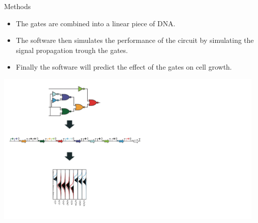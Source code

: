 \documentclass[10pt]{beamer}
\begin{document}
\begin{frame}{Methods}
    \begin{minipage}{.4\textwidth}
        \centering
        \begin{itemize}
            \item The gates are combined into a linear piece of DNA.
            \item The software then simulates the performance of the circuit by simulating the signal propagation trough the gates.  
            \item Finally the software will predict the effect of the gates on cell growth. 
        \end{itemize}
    \end{minipage}%
    \begin{minipage}{.6\textwidth}
        \centering
        \includegraphics[width=13cm]{overview3.jpg}
    \end{minipage}

\end{frame}
\end{document}
